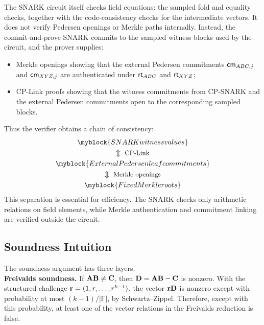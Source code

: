 The SNARK circuit itself checks field equations: the sampled fold and equality
checks, together with the code-consistency checks for the intermediate vectors.
It does not verify Pedersen openings or Merkle paths internally.  Instead, the
commit-and-prove SNARK commits to the sampled witness blocks used by the
circuit, and the prover supplies:
\begin{itemize}
  \item Merkle openings showing that the external Pedersen commitments
  \(\textsf{cm}_{ABC,j}\) and \(\textsf{cm}_{XYZ,j}\) are authenticated under
  \(\textsf{rt}_{ABC}\) and \(\textsf{rt}_{XYZ}\);
  \item CP-Link proofs showing that the witness commitments from CP-SNARK and the
  external Pedersen commitments open to the corresponding sampled blocks.
\end{itemize}
Thus the verifier obtains a chain of consistency:
\begin{gather*}
\myblock{SNARK witness values} \\
\Updownarrow \ \text{\small CP-Link} \\
\myblock{External Pedersen leaf commitments} \\
\Updownarrow \ \text{\small Merkle openings} \\
\myblock{Fixed Merkle roots}
\end{gather*}
This separation is essential for efficiency.  The SNARK checks only arithmetic
relations on field elements, while Merkle authentication and commitment
linking are verified outside the circuit.

\subsection{Soundness Intuition}
\label{sec:overview-soundness}
The soundness argument has three layers. \\

\noindent\textbf{Freivalds soundness.}
If \(\mathbf{A}\mathbf{B}\neq\mathbf{C}\), then
\(\mathbf{D}=\mathbf{A}\mathbf{B}-\mathbf{C}\) is nonzero.  With the structured challenge
\(\mathbf{r}=(1,r,\ldots,r^{k-1})\), the vector
\(\mathbf{r}\mathbf{D}\) is nonzero except with probability at most
\((k-1)/|\mathbb{F}|\), by Schwartz--Zippel.  Therefore, except with this
probability, at least one of the vector relations in the Freivalds reduction is
false. \\

